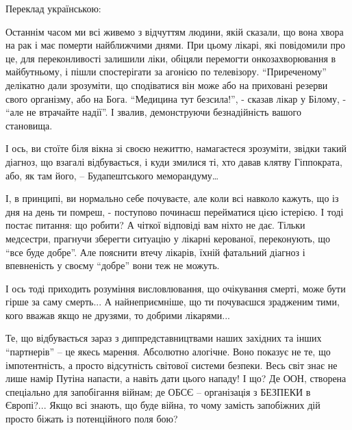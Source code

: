  
 
 
 
 
\zzSecCmt

\begin{itemize} %

Переклад українською:

Останнім часом ми всі живемо з відчуттям людини, якій сказали, що вона хвора на
рак і має померти найближчими днями. При цьому лікарі, які повідомили про це,
для переконливості залишили ліки, обіцяли перемогти онкозахворювання в
майбутньому, і пішли спостерігати за агонією по телевізору. \enquote{Приреченому}
делікатно дали зрозуміти, що сподіватися він може або на приховані резерви
свого організму, або на Бога. \enquote{Медицина тут безсила!}, - сказав лікар у Білому,
- \enquote{але не втрачайте надії}. І звалив, демонструючи безнадійність вашого
становища.

І ось, ви стоїте біля вікна зі своєю нежиттю, намагаєтеся зрозуміти, звідки
такий діагноз, що взагалі відбувається, і куди змилися ті, хто давав клятву
Гіппократа, або, як там його, – Будапештського меморандуму…

І, в принципі, ви нормально себе почуваєте, але коли всі навколо кажуть, що із
дня на день ти помреш, - поступово починаєш перейматися цією істерією. І тоді
постає питання: що робити? А чіткої відповіді вам ніхто не дає. Тільки
медсестри, прагнучи зберегти ситуацію у лікарні керованої, переконують, що \enquote{все
буде добре}. Але пояснити втечу лікарів, їхній фатальний діагноз і впевненість
у своєму \enquote{добре} вони теж не можуть.

І ось тоді приходить розуміння висловлювання, що очікування смерті, може бути
гірше за саму смерть... А найнеприємніше, що ти почуваєшся зрадженим тими, кого
вважав якщо не друзями, то добрими лікарями...

Те, що відбувається зараз з диппредставництвами наших західних та інших
\enquote{партнерів} – це якесь марення. Абсолютно алогічне. Воно показує не те,
що імпотентність, а просто відсутність світової системи безпеки. Весь світ знає
не лише намір Путіна напасти, а навіть дати цього нападу! І що? Де ООН,
створена спеціально для запобігання війнам; де ОБСЄ – організація з БЕЗПЕКИ в
Європі?...  Якщо всі знають, що буде війна, то чому замість запобіжних дій
просто біжать із потенційного поля бою?


\end{itemize}
